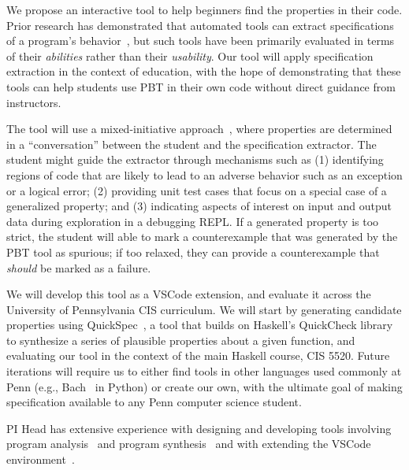 We propose an interactive tool to help beginners find the properties in their
code. Prior research has demonstrated that automated tools can extract
specifications of a program's behavior~\cite{ref:ammons2002mining,
ref:le2018deep, ref:claessen2010quickspec}, but such tools have been primarily
evaluated in terms of their {\em abilities} rather than their {\em usability}.
Our tool will apply specification extraction in the context of education,
with the hope of demonstrating that these tools can help students use PBT in
their own code without direct guidance from instructors.

The tool will use a mixed-initiative approach~\cite{ref:allen1999mixed}, where
properties are determined in a ``conversation'' between the student and the
specification extractor.  The student might guide the extractor through
mechanisms such as (1) identifying regions of code that are likely to lead to an
adverse behavior such as an exception or a logical error; (2) providing unit
test cases that focus on a special case of a generalized property; and (3)
indicating aspects of interest on input and output data during exploration in a
debugging REPL.  If a generated property is too strict, the student will able to
mark a counterexample that was generated by the PBT tool as spurious; if too
relaxed, they can provide a counterexample that {\em should} be
marked as a failure.

We will develop this tool as a VSCode extension, and evaluate it across the
University of Pennsylvania CIS curriculum.  We will start by generating
candidate properties using QuickSpec~\cite{ref:claessen2010quickspec}, a tool
that builds on Haskell's QuickCheck library to synthesize a series of plausible
properties about a given function, and evaluating our tool in the context of the
main Haskell course, CIS 5520.
Future iterations will require us to either find tools in other languages used
commonly at Penn (e.g., Bach~\cite{smith_discovering_2017} in Python) or create
our own, with the ultimate goal of making specification available to any Penn
computer science student.

PI Head has extensive experience with designing and developing tools involving
program analysis~\cite{ref:head2018interactive,ref:head2019managing} and program
synthesis~\cite{ref:head2017writing} and with extending the VSCode
environment~\cite{ref:head2020composing}.

\immediate\closeout\workplanfile
{}

